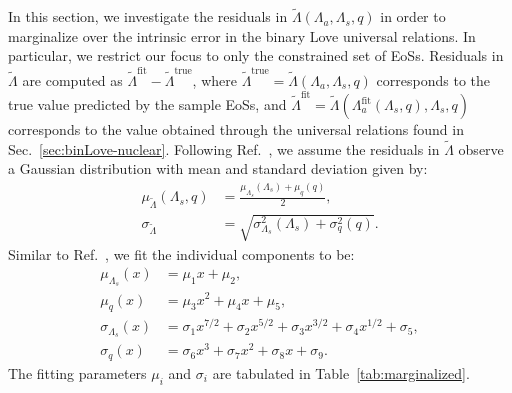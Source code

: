 \documentclass[prd,twocolumn,nofootinbib,superscriptaddress,amsmath,amssymb]{revtex4-1}
\begin{document}
In this section, we investigate the residuals in $\tilde{\Lambda}(\Lambda_a,\Lambda_s,q)$ in order to marginalize over the intrinsic error in the binary Love universal relations.
In particular, we restrict our focus to only the constrained set of EoSs.
Residuals in $\tilde\Lambda$ are computed as $\tilde{\Lambda}^{\text{fit}}-\tilde{\Lambda}^{\text{true}}$, where $\tilde{\Lambda}^{\text{true}}=\tilde{\Lambda}(\Lambda_a,\Lambda_s,q)$ corresponds to the true value predicted by the sample EoSs, and $\tilde{\Lambda}^{\text{fit}}=\tilde{\Lambda}(\Lambda_a^{\text{fit}}(\Lambda_s,q),\Lambda_s,q)$ corresponds to the value obtained through the universal relations found in Sec.~\ref{sec:binLove-nuclear}.
Following Ref.~\cite{Katerina:residuals}, we assume the residuals in $\tilde{\Lambda}$ observe a Gaussian distribution with mean and standard deviation given by:
\begin{align}
\mu_{\tilde{\Lambda}}(\Lambda_s,q) &=\frac{\mu_{\Lambda_s}(\Lambda_s)+\mu_{q}(q)}{2},\\ 
\sigma_{\tilde{\Lambda}} &=\sqrt{\sigma_{\Lambda_s}^2(\Lambda_s) + \sigma_{q}^2(q)}. 
\end{align}
Similar to Ref.~\cite{Katerina:residuals}, we fit the individual components to be:
\begin{align}
\mu_{\Lambda_s}(x) &= \mu_1 x + \mu_2, \label{eq:margFit1}\\ 
\mu_{q}(x) &= \mu_3 x^2 + \mu_4 x + \mu_5, \label{eq:margFit2}\\ 
\sigma_{\Lambda_s}(x) &= \sigma_1 x^{7/2} + \sigma_2 x^{5/2} + \sigma_3 x^{3/2} +  \sigma_4 x^{1/2} + \sigma_5, \label{eq:margFit3}\\ 
\sigma_{q}(x) &= \sigma_6 x^3 + \sigma_7 x^2 + \sigma_8 x + \sigma_9. \label{eq:margFit4}
\end{align}
The fitting parameters $\mu_i$ and $\sigma_i$ are tabulated in Table~\ref{tab:marginalized}.
\end{document}
